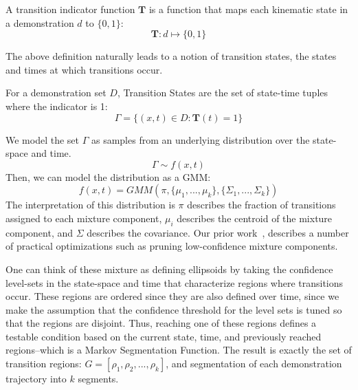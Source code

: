 \begin{definition}
A transition indicator function $\mathbf{T}$ is a function that maps each kinematic state in a demonstration $d$ to $\{0,1\}$:
\[
\mathbf{T}: d \mapsto \{0,1\}
\]
\end{definition}

The above definition naturally leads to a notion of transition states, the states and times at which transitions occur.

\begin{definition}
For a demonstration set $D$, Transition States are the set of state-time tuples where the indicator is 1:
\[
\Gamma = \{(x,t) \in D : \mathbf{T}(t) = 1\}
\]
\end{definition}

We model the set $\Gamma$ as samples from an underlying distribution over the state-space and time.
\[
\Gamma \sim f(x,t)
\]
Then, we can model the distribution as a GMM:
\[
f(x,t) = GMM(\pi,\{\mu_1,...,\mu_k\}, \{\Sigma_1,...,\Sigma_k\})
\]
The interpretation of this distribution is $\pi$ describes the fraction of transitions assigned to each mixture component, $\mu_i$ describes the centroid of the mixture component, and $\Sigma$ describes the covariance.
Our prior work~\cite{krishnan2015tsc,murali2016}, describes a number of practical optimizations such as pruning low-confidence mixture components.

One can think of these mixture as defining ellipsoids by taking the confidence level-sets in the state-space and time that characterize regions where transitions occur.
These regions are ordered since they are also defined over time, since we make the assumption that the confidence threshold for the level sets is tuned so that the regions are disjoint.
Thus, reaching one of these regions defines a testable condition based on the current state, time, and previously reached regions--which is a Markov Segmentation Function.
The result is exactly the set of transition regions: $G = [\rho_1, \rho_2,...,\rho_k]$, and segmentation of each demonstration trajectory into $k$ segments.


